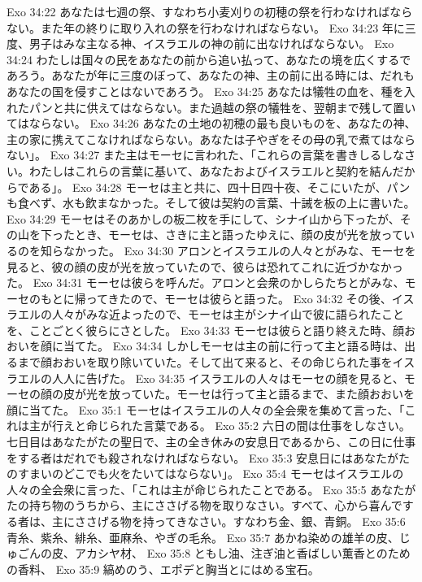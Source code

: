 Exo 34:22  あなたは七週の祭、すなわち小麦刈りの初穂の祭を行わなければならない。また年の終りに取り入れの祭を行わなければならない。
Exo 34:23  年に三度、男子はみな主なる神、イスラエルの神の前に出なければならない。
Exo 34:24  わたしは国々の民をあなたの前から追い払って、あなたの境を広くするであろう。あなたが年に三度のぼって、あなたの神、主の前に出る時には、だれもあなたの国を侵すことはないであろう。
Exo 34:25  あなたは犠牲の血を、種を入れたパンと共に供えてはならない。また過越の祭の犠牲を、翌朝まで残して置いてはならない。
Exo 34:26  あなたの土地の初穂の最も良いものを、あなたの神、主の家に携えてこなければならない。あなたは子やぎをその母の乳で煮てはならない」。
Exo 34:27  また主はモーセに言われた、「これらの言葉を書きしるしなさい。わたしはこれらの言葉に基いて、あなたおよびイスラエルと契約を結んだからである」。
Exo 34:28  モーセは主と共に、四十日四十夜、そこにいたが、パンも食べず、水も飲まなかった。そして彼は契約の言葉、十誡を板の上に書いた。
Exo 34:29  モーセはそのあかしの板二枚を手にして、シナイ山から下ったが、その山を下ったとき、モーセは、さきに主と語ったゆえに、顔の皮が光を放っているのを知らなかった。
Exo 34:30  アロンとイスラエルの人々とがみな、モーセを見ると、彼の顔の皮が光を放っていたので、彼らは恐れてこれに近づかなかった。
Exo 34:31  モーセは彼らを呼んだ。アロンと会衆のかしらたちとがみな、モーセのもとに帰ってきたので、モーセは彼らと語った。
Exo 34:32  その後、イスラエルの人々がみな近よったので、モーセは主がシナイ山で彼に語られたことを、ことごとく彼らにさとした。
Exo 34:33  モーセは彼らと語り終えた時、顔おおいを顔に当てた。
Exo 34:34  しかしモーセは主の前に行って主と語る時は、出るまで顔おおいを取り除いていた。そして出て来ると、その命じられた事をイスラエルの人人に告げた。
Exo 34:35  イスラエルの人々はモーセの顔を見ると、モーセの顔の皮が光を放っていた。モーセは行って主と語るまで、また顔おおいを顔に当てた。
Exo 35:1  モーセはイスラエルの人々の全会衆を集めて言った、「これは主が行えと命じられた言葉である。
Exo 35:2  六日の間は仕事をしなさい。七日目はあなたがたの聖日で、主の全き休みの安息日であるから、この日に仕事をする者はだれでも殺されなければならない。
Exo 35:3  安息日にはあなたがたのすまいのどこでも火をたいてはならない」。
Exo 35:4  モーセはイスラエルの人々の全会衆に言った、「これは主が命じられたことである。
Exo 35:5  あなたがたの持ち物のうちから、主にささげる物を取りなさい。すべて、心から喜んでする者は、主にささげる物を持ってきなさい。すなわち金、銀、青銅。
Exo 35:6  青糸、紫糸、緋糸、亜麻糸、やぎの毛糸。
Exo 35:7  あかね染めの雄羊の皮、じゅごんの皮、アカシヤ材、
Exo 35:8  ともし油、注ぎ油と香ばしい薫香とのための香料、
Exo 35:9  縞めのう、エポデと胸当とにはめる宝石。
